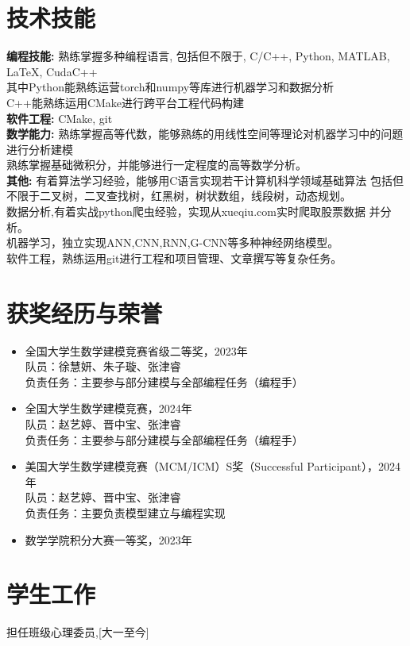 \documentclass[a4paper,10pt]{article}
\begin{document}
\section*{技术技能}
\textbf{编程技能:} 熟练掌握多种编程语言, 包括但不限于, C/C++, Python, MATLAB, LaTeX, CudaC++  \\
其中Python能熟练运营torch和numpy等库进行机器学习和数据分析 \\
C++能熟练运用CMake进行跨平台工程代码构建 \\
\textbf{软件工程:} CMake, git \\
\textbf{数学能力:} 熟练掌握高等代数，能够熟练的用线性空间等理论对机器学习中的问题进行分析建模 \\
熟练掌握基础微积分，并能够进行一定程度的高等数学分析。\\
\textbf{其他:} 有着算法学习经验，能够用C语言实现若干计算机科学领域基础算法
包括但不限于二叉树，二叉查找树，红黑树，树状数组，线段树，动态规划。\\
数据分析,有着实战python爬虫经验，实现从xueqiu.com实时爬取股票数据
并分析。\\
机器学习，独立实现ANN,CNN,RNN,G-CNN等多种神经网络模型。\\
软件工程，熟练运用git进行工程和项目管理、文章撰写等复杂任务。

\section*{获奖经历与荣誉}
\begin{itemize}
      \item 全国大学生数学建模竞赛省级二等奖，2023年 \\
            队员：徐慧妍、朱子璇、张津睿 \\
            负责任务：主要参与部分建模与全部编程任务（编程手）
      \item 全国大学生数学建模竞赛，2024年 \\
            队员：赵艺婷、晋中宝、张津睿 \\
            负责任务：主要参与部分建模与全部编程任务（编程手）
      \item 美国大学生数学建模竞赛（MCM/ICM）S奖（Successful Participant），2024年 \\
            队员：赵艺婷、晋中宝、张津睿 \\
            负责任务：主要负责模型建立与编程实现
      \item 数学学院积分大赛一等奖，2023年
\end{itemize}

\section*{学生工作}
担任班级心理委员,[大一至今]
\end{document}
